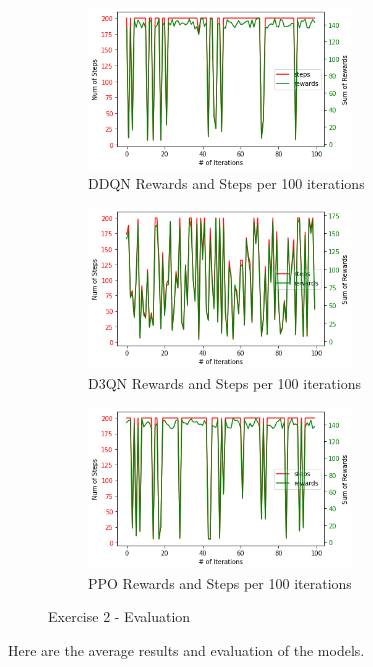 \documentclass[leqno]{article}
\begin{document}
\begin{multicols}{2}
\begin{figure}[H]
\centering
  \begin{subfigure}{8cm}
    \centering\includegraphics[width=7cm]{figs/ddqn_ex2_100_iters.png}
    \caption{DDQN Rewards and Steps per 100 iterations}
  \end{subfigure}
  \begin{subfigure}{8cm}
    \centering\includegraphics[width=7cm]{figs/d3qn_ex2_100_iters.png}
    \caption{D3QN Rewards and Steps per 100 iterations}
  \end{subfigure}
  \begin{subfigure}{8cm}
    \centering\includegraphics[width=7cm]{figs/ppo_ex2_100_iters.png}
    \caption{PPO Rewards and Steps per 100 iterations}
  \end{subfigure}
  \caption{Exercise 2 - Evaluation}
\end{figure}

Here are the average results and evaluation of the models.\\


\end{multicols}
\end{document}
